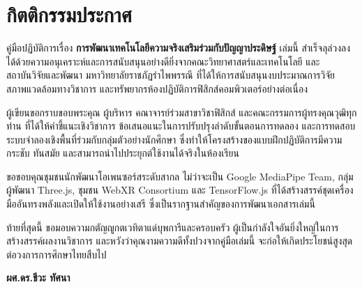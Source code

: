 \chapter*{กิตติกรรมประกาศ}

คู่มือปฏิบัติการเรื่อง \textbf{การพัฒนาเทคโนโลยีความจริงเสริมร่วมกับปัญญาประดิษฐ์} เล่มนี้ สำเร็จลุล่วงลงได้ด้วยความอนุเคราะห์และการสนับสนุนอย่างดียิ่งจากคณะวิทยาศาสตร์และเทคโนโลยี และสถาบันวิจัยและพัฒนา มหาวิทยาลัยราชภัฏรำไพพรรณี ที่ได้ให้การสนับสนุนงบประมาณการวิจัย สภาพแวดล้อมทางวิชาการ และทรัพยากรห้องปฏิบัติการฟิสิกส์คอมพิวเตอร์อย่างต่อเนื่อง

ผู้เขียนขอกราบขอบพระคุณ ผู้บริหาร คณาจารย์ร่วมสาขาวิชาฟิสิกส์ และคณะกรรมการผู้ทรงคุณวุฒิทุกท่าน ที่ได้ให้คำชี้แนะเชิงวิชาการ ข้อเสนอแนะในการปรับปรุงลำดับขั้นตอนการทดลอง และการทดสอบระบบจำลองเชิงพื้นที่ร่วมกับกลุ่มตัวอย่างนักศึกษา ซึ่งทำให้โครงสร้างของแบบฝึกปฏิบัติการมีความกระชับ ทันสมัย และสามารถนำไปประยุกต์ใช้งานได้จริงในห้องเรียน

ขอขอบคุณชุมชนนักพัฒนาโอเพนซอร์สระดับสากล ไม่ว่าจะเป็น Google MediaPipe Team, กลุ่มผู้พัฒนา Three.js, ชุมชน WebXR Consortium และ TensorFlow.js ที่ได้สร้างสรรค์ชุดเครื่องมืออันทรงพลังและเปิดให้ใช้งานอย่างเสรี ซึ่งเป็นรากฐานสำคัญของการพัฒนาเอกสารเล่มนี้

ท้ายที่สุดนี้ ขอมอบความกตัญญูกตเวทิตาแด่บุพการีและครอบครัว ผู้เป็นกำลังใจอันยิ่งใหญ่ในการสร้างสรรค์ผลงานวิชาการ และหวังว่าคุณงามความดีทั้งปวงจากคู่มือเล่มนี้ จะก่อให้เกิดประโยชน์สูงสุดต่อวงการการศึกษาไทยสืบไป

\vspace{1.5cm}
\begin{flushright}
\textbf{ผศ.ดร.ชีวะ ทัศนา}
\end{flushright}
